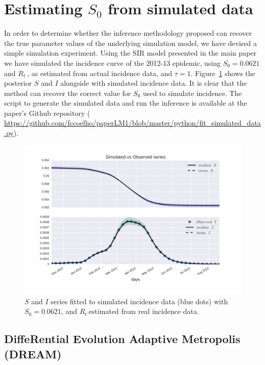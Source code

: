 \documentclass[a4paper,10pt]{article}
\def \rr {$R_{t}\:$}
\begin{document}
\section*{Estimating $S_0$ from simulated data}

In order to determine whether the inference methodology proposed can 
recover the true parameter values of the underlying simulation model, we have 
devised a simple simulation experiment.
Using the SIR model presented in the main paper we have simulated the incidence 
curve of the  2012-13 epidemic, using 
$S_0 = 0.0621$ and \rr, as estimated from actual incidence data, and $\tau=1$. 
Figure~\ref{fig:sim_data} shows the posterior $S$ and $I$ alongside with 
simulated incidence data.
It is clear that the method can recover the correct value for $S_0$ 
used to   simulate incidence.
The script to generate the simulated data and run the inference is available at 
the paper's Github repository 
(\url{
https://github.com/fccoelho/paperLM1/blob/master/python/fit_simulated_data.py}).

\begin{figure}
 \centering
 \includegraphics[width=14cm]{./plots/Sim_DengueS2012_11_series.png}
 \caption{$S$ and $I$ series fitted to simulated incidence data (blue dots) 
with $S_0=0.0621$, and \rr estimated from real incidence data.}
 \label{fig:sim_data}
\end{figure}

\subsection*{DiffeRential Evolution Adaptive Metropolis (DREAM)}
\end{document}

